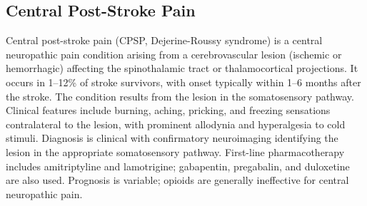 \subsection{Central Post-Stroke Pain}
\label{sec:Central Post-Stroke Pain}
Central post-stroke pain (CPSP, Dejerine-Roussy syndrome) is a central neuropathic pain condition arising from a cerebrovascular lesion (ischemic or hemorrhagic) affecting the spinothalamic tract or thalamocortical projections. It occurs in 1--12\% of stroke survivors, with onset typically within 1--6 months after the stroke. The condition results from the lesion in the somatosensory pathway. Clinical features include burning, aching, pricking, and freezing sensations contralateral to the lesion, with prominent allodynia and hyperalgesia to cold stimuli. Diagnosis is clinical with confirmatory neuroimaging identifying the lesion in the appropriate somatosensory pathway. First-line pharmacotherapy includes amitriptyline and lamotrigine; gabapentin, pregabalin, and duloxetine are also used. Prognosis is variable; opioids are generally ineffective for central neuropathic pain.

